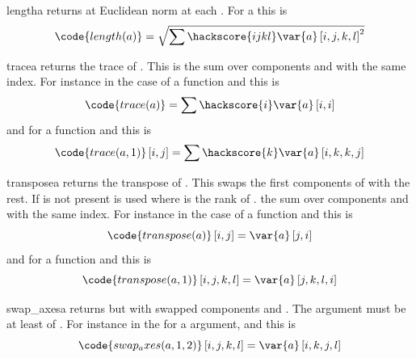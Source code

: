 \begin{funcdesc}{length}{a}
returns at Euclidean norm at each \DataSamplePoints. For a \RankFour {} this is
\begin{equation}
\code{length(a)}=\sqrt{\sum\hackscore{ijkl} \var{a} \left[i,j,k,l\right]^2}
\end{equation} 
\end{funcdesc}
\begin{funcdesc}{trace}{a}
returns the trace of . This is the sum over components  and  with the same index. For instance in the
case of a \RankTwo function and this is 
\begin{equation}
\code{trace(a)}=\sum\hackscore{i} \var{a} \left[i,i\right]
\end{equation} 
and for a \RankFour function and   this is
\begin{equation}
\code{trace(a,1)}\left[i,j\right]=\sum\hackscore{k} \var{a} \left[i,k,k,j\right]
\end{equation} 
\end{funcdesc}

\begin{funcdesc}{transpose}{a}
returns the transpose of . This swaps the first  components of  with the rest. If  is not
present  is used where  is the rank of . 
 the sum over components  and  with the same index. For instance in the
case of a \RankTwo function and this is 
\begin{equation}
\code{transpose(a)}\left[i,j\right]=\var{a} \left[j,i\right]
\end{equation} 
and for a \RankFour function and   this is
\begin{equation}
\code{transpose(a,1)}\left[i,j,k,l\right]=\var{a} \left[j,k,l,i\right]
\end{equation} 
\end{funcdesc}

\begin{funcdesc}{swap_axes}{a}
returns  but with swapped components  and  . The argument  must be
at least of \RankTwo. For instance in the 
for a \RankFour argument,  and  this is
\begin{equation}
\code{swap_axes(a,1,2)}\left[i,j,k,l\right]=\var{a} \left[i,k,j,l\right]
\end{equation} 
\end{funcdesc}

